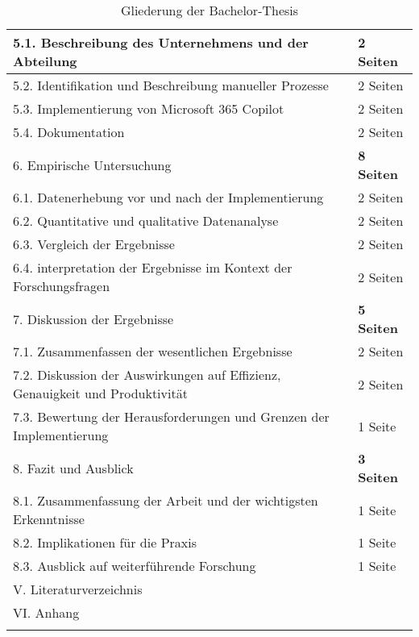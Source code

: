 \begin{longtable}{|p{6cm}|p{6cm}|}
    \hline
        5.1. Beschreibung des Unternehmens und der Abteilung & 2 Seiten \\
        \hline
        5.2. Identifikation und Beschreibung manueller Prozesse & 2 Seiten \\
        \hline
        5.3. Implementierung von Microsoft 365 Copilot & 2 Seiten \\
        \hline
        5.4. Dokumentation & 2 Seiten \\
    \hline
    6. Empirische Untersuchung & \textbf{8 Seiten} \\
    \hline
        6.1. Datenerhebung vor und nach der Implementierung & 2 Seiten \\
        \hline
        6.2. Quantitative und qualitative Datenanalyse & 2 Seiten \\
        \hline
        6.3. Vergleich der Ergebnisse & 2 Seiten \\
        \hline
        6.4. interpretation der Ergebnisse im Kontext der Forschungsfragen & 2 Seiten \\
    \hline
    7. Diskussion der Ergebnisse& \textbf{5 Seiten} \\
    \hline
        7.1. Zusammenfassen der wesentlichen Ergebnisse & 2 Seiten \\
        \hline
        7.2. Diskussion der Auswirkungen auf Effizienz, Genauigkeit und Produktivität & 2 Seiten \\
        \hline
        7.3. Bewertung der Herausforderungen und Grenzen der Implementierung & 1 Seite \\
    \hline
    8. Fazit und Ausblick & \textbf{3 Seiten} \\
    \hline
        8.1. Zusammenfassung der Arbeit und der wichtigsten Erkenntnisse & 1 Seite \\
        \hline
        8.2. Implikationen für die Praxis & 1 Seite \\
        \hline
        8.3. Ausblick auf weiterführende Forschung & 1 Seite \\
    \hline
    V. Literaturverzeichnis & \\
    \hline
    VI. Anhang & \\
    \hline
    \caption{Gliederung der Bachelor-Thesis} \label{tab:gliederung} \\
\end{longtable}



\clearpage